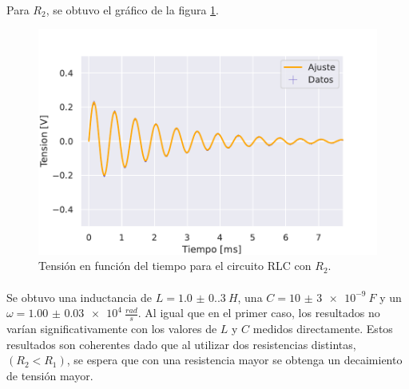 \paragraph{}
Para $R_2$, se obtuvo el gráfico de la figura \ref{fig:RLC subamortiguado 2}.  
\begin{figure} [H]
    \centering
    \includegraphics[scale=0.7]{Figuras/RLC/RLC subamortiguado 2.pdf}
    \caption{Tensión en función del tiempo para el circuito RLC con $R_2$. }
    \label{fig:RLC subamortiguado 2}
\end{figure}
\paragraph{} 
Se obtuvo una inductancia de $L = \SI{1.0(0.3)}{H}$, una $C = \SI{10(3)e-9}{F}$ y un $\omega = \SI{1.00(3)e4}{\frac{rad}{s}}$. Al igual que en el primer caso, los resultados no varían significativamente con los valores de $L$ y $C$ medidos directamente. Estos resultados son coherentes dado que al utilizar dos resistencias distintas, $(R_2 < R_1)$, se espera que con una resistencia mayor se obtenga un decaimiento de tensión mayor. 